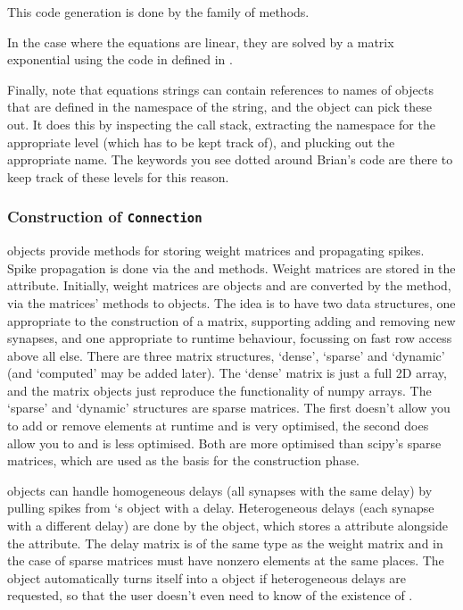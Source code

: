 \documentclass[letterpaper,10pt,english]{manual}
\begin{document}
This code generation is done by the  family
of methods.

In the case where the equations are linear, they are solved by a matrix
exponential using the code in  defined in
.

Finally, note that equations strings can contain references to names of objects
that are defined in the namespace of the string, and the 
object can pick these out. It does this by inspecting the call stack, extracting
the namespace for the appropriate level (which has to be kept track of), and
plucking out the appropriate name. The  keywords you see dotted
around Brian's code are there to keep track of these levels for this reason.


\subsubsection{Construction of \texttt{Connection}}

 objects provide methods for storing weight matrices and
propagating spikes. Spike propagation is done via the 
and  methods. Weight matrices are stored in the 
attribute. Initially, weight matrices are  objects
and are converted by the  method, via the matrices'
 methods to  objects. The idea
is to have two data structures, one appropriate to the construction of a matrix,
supporting adding and removing new synapses, and one appropriate to runtime
behaviour, focussing on fast row access above all else. There are three matrix
structures, `dense', `sparse' and `dynamic' (and `computed' may be added later).
The `dense' matrix is just a full 2D array, and the matrix objects just reproduce
the functionality of numpy arrays. The `sparse' and `dynamic' structures are
sparse matrices. The first doesn't allow you to add or remove elements at runtime
and is very optimised, the second does allow you to and is less optimised. Both
are more optimised than scipy's sparse matrices, which are used as the basis for
the construction phase.

 objects can handle homogeneous delays (all synapses with the
same delay) by pulling spikes from `s  object with a
delay. Heterogeneous delays (each synapse with a different delay) are done by
the  object, which stores a  attribute
alongside the  attribute. The delay matrix is of the same type as the
weight matrix and in the case of sparse matrices must have nonzero elements at
the same places. The  object automatically turns itself into
a  object if heterogeneous delays are requested, so that
the user doesn't even need to know of the existence of .
\end{document}
